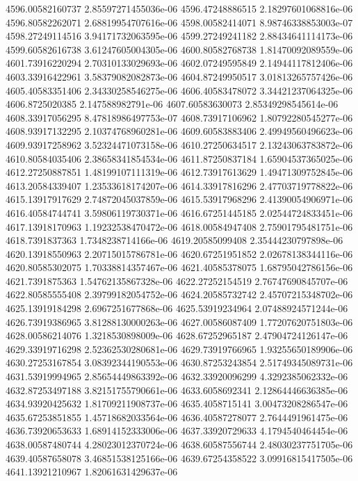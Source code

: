 {4596.00582160737 2.85597271455036e-06
4596.47248886515 2.18297601068816e-06
4596.80582262071 2.68819954707616e-06
4598.00582414071 8.98746338853003e-07
4598.27249114516 3.94171732063595e-06
4599.27249241182 2.88434641114173e-06
4599.60582616738 3.61247605004305e-06
4600.80582768738 1.81470092089559e-06
4601.73916220294 2.70310133029693e-06
4602.07249595849 2.14944117812406e-06
4603.33916422961 3.58379082082873e-06
4604.87249950517 3.01813265757426e-06
4605.40583351406 2.34330258546275e-06
4606.40583478072 3.34421237064325e-06
4606.8725020385 2.147588982791e-06
4607.60583630073 2.85349298545614e-06
4608.33917056295 8.47818986497753e-07
4608.73917106962 1.80792280545277e-06
4608.93917132295 2.10374768960281e-06
4609.60583883406 2.49949560496623e-06
4609.93917258962 3.52324471073158e-06
4610.27250634517 2.13243063783872e-06
4610.80584035406 2.38658341854534e-06
4611.87250837184 1.65904537365025e-06
4612.27250887851 1.48199107111319e-06
4612.73917613629 1.49471309752845e-06
4613.20584339407 1.23533618174207e-06
4614.33917816296 2.47703719778822e-06
4615.13917917629 2.74872045037859e-06
4615.53917968296 2.41390054906971e-06
4616.40584744741 3.59806119730371e-06
4616.67251445185 2.02544724833451e-06
4617.13918170963 1.19232538470472e-06
4618.00584947408 2.75901795481751e-06
4618.7391837363 1.7348238714166e-06
4619.20585099408 2.35444230797898e-06
4620.13918550963 2.20715015786781e-06
4620.67251951852 2.02678138344116e-06
4620.80585302075 1.70338814357467e-06
4621.40585378075 1.68795042786156e-06
4621.7391875363 1.54762135867328e-06
4622.27252154519 2.76747690845707e-06
4622.80585555408 2.39799182054752e-06
4624.20585732742 2.45707215348702e-06
4625.13919184298 2.6967251677868e-06
4625.53919234964 2.07488924571244e-06
4626.73919386965 3.81288130000263e-06
4627.00586087409 1.77207620751803e-06
4628.00586214076 1.3218530898009e-06
4628.67252965187 2.47904724126147e-06
4629.33919716298 2.52362530280681e-06
4629.73919766965 1.93255650189906e-06
4630.27253167854 3.08392344190553e-06
4630.87253243854 2.51749345089731e-06
4631.53919994965 2.85654449863392e-06
4632.33920096299 4.3292385062332e-06
4632.87253497188 3.82151755790661e-06
4633.6058692341 2.12864446636385e-06
4634.93920425632 1.81709211908737e-06
4635.4058715141 3.00473208286547e-06
4635.67253851855 1.45718682033564e-06
4636.40587278077 2.7644491961475e-06
4636.73920653633 1.68914152333006e-06
4637.33920729633 4.1794540464454e-06
4638.00587480744 4.28023012370724e-06
4638.60587556744 2.48030237751705e-06
4639.40587658078 3.46851538125166e-06
4639.67254358522 3.09916815417505e-06
4641.13921210967 1.82061631429637e-06
}

